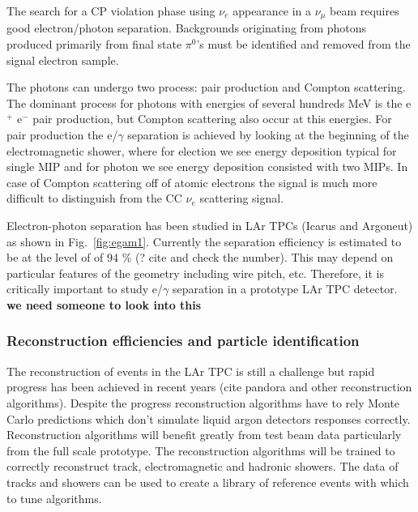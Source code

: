 The search for a CP violation phase using $\nu_e$ appearance 
in a $\nu_\mu$ beam requires good electron/photon separation.
Backgrounds originating from photons produced primarily from 
final state $\pi^0$'s must be identified and removed from the signal
electron sample. 


The photons can undergo two process: pair production and Compton scattering. 
The dominant process for photons with energies of several hundreds MeV  is 
the e$^+$ e$^-$ pair production, but Compton scattering also occur at this 
energies. For pair production the e/$\gamma$ separation is achieved by looking 
at the beginning of the electromagnetic shower, where for election we see energy 
deposition typical for single MIP and for photon we see energy deposition consisted 
with two MIPs. In case of Compton scattering off of atomic electrons the 
signal is much more difficult to distinguish from the CC $\nu_e$ scattering signal.

Electron-photon separation has been studied in LAr TPCs
(Icarus and Argoneut) as shown in Fig.~\ref{fig:egam1}.
Currently the 
separation efficiency is estimated to be at the level of of 94 \% (? cite and 
check the number). 
This may depend on particular features of the geometry including wire pitch, etc.
Therefore, it is critically important 
to study e/$\gamma$ separation in a prototype LAr TPC detector.
{\bf we need someone to look into this}



\subsubsection{Reconstruction efficiencies and particle identification}
\label{detbeam_pid}

The reconstruction of events in the LAr TPC is still a challenge but rapid progress has been achieved in recent years (cite pandora and other reconstruction algorithms). Despite the progress reconstruction algorithms have to rely Monte Carlo predictions which don't simulate liquid argon detectors responses correctly. Reconstruction algorithms will benefit greatly from test beam data particularly from the full scale prototype. The reconstruction algorithms will be trained to correctly reconstruct track, electromagnetic and hadronic showers.
The data of tracks and showers can be used to create a library of reference events with which to tune algorithms.

